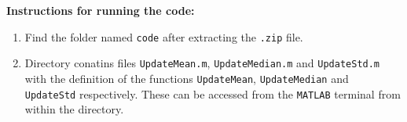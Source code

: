 \documentclass[11pt]{article}
\begin{document}
\textbf{Instructions for running the code:}
\begin{enumerate}[noitemsep]
    \item Find the folder named \texttt{code} after extracting the \texttt{.zip} file.
    \item Directory conatins files \texttt{UpdateMean.m}, \texttt{UpdateMedian.m} and \texttt{UpdateStd.m} with the definition of the functions \texttt{UpdateMean}, \texttt{UpdateMedian} and \texttt{UpdateStd} respectively. These can be accessed from the \texttt{MATLAB} terminal from within the directory.
\end{enumerate}
\end{document}
